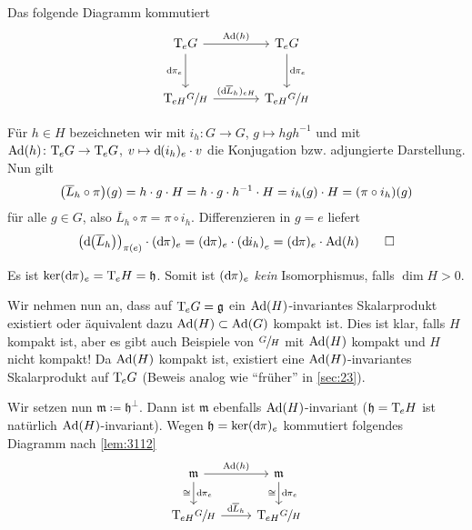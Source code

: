 \begin{lemma}[{name=[kommutierendes Diagramm mit Isotropiegruppe]},label=lem:3112]
	Das folgende Diagramm kommutiert
	\[
		\begin{tikzcd}[sep=large]
			\Tmap_e G \rar["\Ad(h)"] \dar["\mathd \pi_e"'] & \Tmap_e G \dar["\mathd \pi_e"] \\
			\Tmap_{eH} \sfrac{G}{H} \rar["(\mathd \overline{L}_h)_{eH}"] & \Tmap_{eH} \sfrac{G}{H}
		\end{tikzcd}
	\]
\end{lemma}
\begin{beweis}
	Für $h \in H$ bezeichneten wir mit $i_h \colon G \to G$, $g \mapsto h g h^{-1}$ und mit $\operatorname{Ad}(h) \colon \mathrm{T}\mkern-0.85mu_e G \to \mathrm{T}\mkern-0.85mu_e G$, $v \mapsto \mathrm{d}\mkern-1.0mu (i_h)_e \cdot v$ die Konjugation bzw. adjungierte Darstellung.
	Nun gilt
	\begin{align}
		\enbrace*{\overline{L}_h \circ \pi} (g) = h \cdot g \cdot H = h \cdot g \cdot h^{-1} \cdot H = i_h(g) \cdot H = (\pi \circ i_h)(g)
	\end{align}
	für alle $g \in G$, also $\overline{L}_h \circ \pi = \pi \circ i_h$.
	Differenzieren in $g=e$ liefert
	\[
		\enbrace*{\mathd \enbrace*{\overline{L}_h}}_{\pi(e)} \cdot (\mathd \pi)_e = (\mathd \pi)_e \cdot \enbrace*{\mathd i_h}_e = (\mathd \pi)_e \cdot \Ad(h) \qedhere
	\]
\end{beweis}

\begin{bemerkung*}[{name=[Differential der Projektion ist nicht injektiv]}]
	Es ist $\ker (\mathrm{d}\mkern-1.0mu \pi)_e = \mathrm{T}\mkern-0.85mu_e H =\mathfrak{h}$.
	Somit ist $(\mathrm{d}\mkern-1.0mu \pi)_e$ \emph{kein} Isomorphismus, falls $\dim H > 0$.
\end{bemerkung*}

Wir nehmen nun an, dass auf $\mathrm{T}\mkern-0.85mu_e G = \mathfrak{g}$ ein $\operatorname{Ad}(H)$-invariantes Skalarprodukt existiert oder äquivalent dazu $\operatorname{Ad}(H) \subset \operatorname{Ad}(G)$ kompakt ist. 
Dies ist klar, falls $H$ kompakt ist, aber es gibt auch Beispiele von $\sfrac{G}{H}$ mit $\operatorname{Ad}(H)$ kompakt und $H$ nicht kompakt!
Da $\operatorname{Ad}(H)$ kompakt ist, existiert eine $\operatorname{Ad}(H)$-invariantes Skalarprodukt auf $\mathrm{T}\mkern-0.85mu_e G$ (Beweis analog wie \enquote{früher} in \cref{sec:23}).

Wir setzen nun $\mathfrak{m} \coloneqq \mathfrak{h}^\perp$.
Dann ist $\mathfrak{m}$ ebenfalls $\operatorname{Ad}(H)$-invariant ($\mathfrak{h} = \mathrm{T}\mkern-0.85mu_e H$ ist natürlich $\operatorname{Ad}(H)$-invariant). 
Wegen $\mathfrak{h} = \ker (\mathrm{d}\mkern-1.0mu \pi)_e$ kommutiert folgendes Diagramm nach \autoref{lem:3112}
\[
	\begin{tikzcd}
		\mathfrak{m} \dar["\mathd \pi_e","\cong"'] \rar["\Ad(h)"] & \mathfrak{m} \dar["\mathd \pi_e","\cong"'] \\
		\Tmap_{eH} \sfrac{G}{H} \rar["\mathd \overline{L}_h"] & \Tmap_{eH} \sfrac{G}{H}
	\end{tikzcd}
\]


